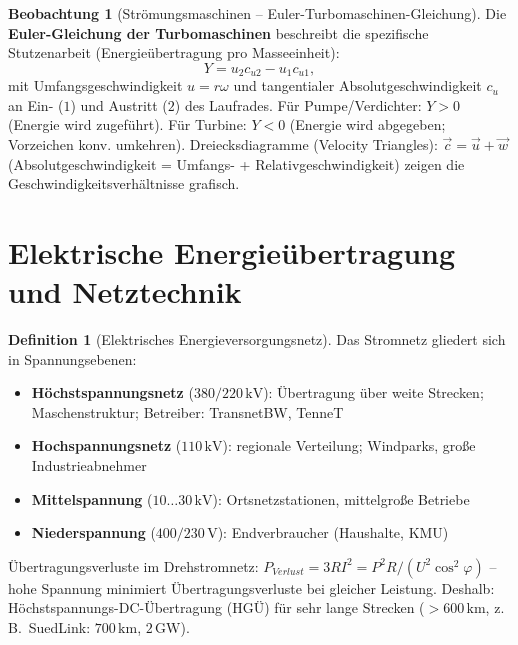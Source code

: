 ﻿\documentclass[a4paper,12pt]{report}
\theoremstyle{definition}
\newtheorem{definition}{Definition}
\newtheorem{beobachtung}{Beobachtung}
\begin{document}
\begin{beobachtung}[Strömungsmaschinen -- Euler-Turbomaschinen-Gleichung]
Die \textbf{Euler-Gleichung der Turbomaschinen} beschreibt die spezifische
Stutzenarbeit (Energieübertragung pro Masseeinheit):
\[
  Y = u_2 c_{u2} - u_1 c_{u1},
\]
mit Umfangsgeschwindigkeit $u = r\omega$ und tangentialer Absolutgeschwindigkeit $c_u$
an Ein- ($1$) und Austritt ($2$) des Laufrades.
Für Pumpe/Verdichter: $Y > 0$ (Energie wird zugeführt).
Für Turbine: $Y < 0$ (Energie wird abgegeben; Vorzeichen konv. umkehren).
Dreiecksdiagramme (Velocity Triangles): $\vec{c} = \vec{u} + \vec{w}$
(Absolutgeschwindigkeit = Umfangs- + Relativgeschwindigkeit) zeigen
die Geschwindigkeitsverhältnisse grafisch.
\end{beobachtung}

\section{Elektrische Energieübertragung und Netztechnik}

\begin{definition}[Elektrisches Energieversorgungsnetz]
Das Stromnetz gliedert sich in Spannungsebenen:
\begin{itemize}
    \item[-] \textbf{Höchstspannungsnetz} ($380/220\,\mathrm{kV}$):
          Übertragung über weite Strecken; Maschenstruktur; Betreiber: TransnetBW, TenneT
    \item[-] \textbf{Hochspannungsnetz} ($110\,\mathrm{kV}$):
          regionale Verteilung; Windparks, große Industrieabnehmer
    \item[-] \textbf{Mittelspannung} ($10\ldots30\,\mathrm{kV}$):
          Ortsnetzstationen, mittelgroße Betriebe
    \item[-] \textbf{Niederspannung} ($400/230\,\mathrm{V}$):
          Endverbraucher (Haushalte, KMU)
\end{itemize}
Übertragungsverluste im Drehstromnetz:
$P_{Verlust} = 3 R I^2 = P^2 R/(U^2\cos^2\!\varphi)$ --
hohe Spannung minimiert Übertragungsverluste bei gleicher Leistung.
Deshalb: Höchstspannungs-DC-Übertragung (HGÜ) für sehr lange Strecken
($> 600\,\mathrm{km}$, z.\,B.\ SuedLink: $700\,\mathrm{km}$, $2\,\mathrm{GW}$).
\end{definition}
\end{document}
